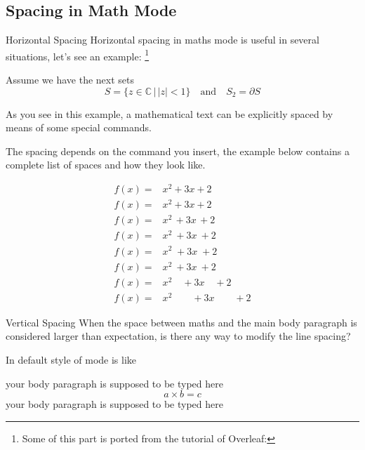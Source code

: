 \subsection{Spacing in Math Mode}

\begin{frame}[fragile]{Horizontal Spacing}
Horizontal spacing in maths mode is useful in several situations, let's see an example: \footnote[1]{Some of this part is ported from the tutorial of Overleaf: } \medskip

\begin{latexexample}
Assume we have the next sets
\[
S = \{ z \in \mathbb{C}\, |\, |z| < 1 \} \quad 
\textrm{and} \quad S_2=\partial{S}
\]
\end{latexexample}

As you see in this example, a mathematical text can be explicitly spaced by means of some special commands.

\end{frame}

\begin{frame}[fragile]
The spacing depends on the command you insert, the example below contains a complete list of spaces and how they look like.

\begin{latexexamplesplit}
\begin{align*}
f(x) =& x^2\! +3x\! +2 \\
f(x) =& x^2+3x+2 \\
f(x) =& x^2\, +3x\, +2 \\
f(x) =& x^2\: +3x\: +2 \\
f(x) =& x^2\; +3x\; +2 \\
f(x) =& x^2\ +3x\ +2 \\
f(x) =& x^2\quad +3x\quad +2 \\
f(x) =& x^2\qquad +3x\qquad +2
\end{align*}
\end{latexexamplesplit}

\end{frame}

\begin{frame}[fragile]{Vertical Spacing}
    When the space between  maths and the main body paragraph is considered larger than expectation, is there any way to modify the line spacing? \medskip
    
    In default style of  mode is like

\begin{latexexample}
your body paragraph is supposed to be typed here
\begin{equation}
  a \times b = c 
\end{equation}
your body paragraph is supposed to be typed here
\end{latexexample}

\end{frame}

